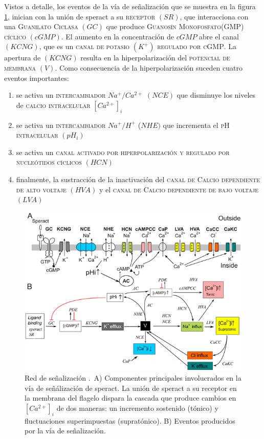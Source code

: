 Vistos a detalle, los eventos de la vía de señalización que se muestra en la figura \ref{fig:erizobBioquimica}, inician con la unión de speract a su \textsc{receptor} $(SR)$, que interacciona con una \textsc{Guanilato Ciclasa} $(GC)$ que produce \textsc{Guanosín Monofosfato(GMP) cíclico} $(cGMP)$. El aumento en la concentración de $cGMP$ abre el canal $(KCNG)$, que es un \textsc{canal de potasio} $(K^+)$ \textsc{regulado por cGMP}. La apertura de $(KCNG)$ resulta en la hiperpolarización del \textsc{potencial de membrana} $(V)$. Como consecuencia de la hiperpolarización suceden cuatro eventos importantes: \begin{enumerate}
\item se activa un \textsc{intercambiador} $Na^+/Ca^{2+}$ $(NCE)$ que disminuye los niveles de \textsc{calcio intracelular} $[Ca^{2+}]_i$
\item se activa un \textsc{intercambiador} $Na^+/H^+$ ($NHE)$ que incrementa el \textsc{pH intracelular} $(pH_i)$
\item se activa un \textsc{canal activado por hiperpolarización y regulado por nucleótidos cíclicos} $(HCN)$
\item finalmente, la sustracción de la inactivación del \textsc{canal de Calcio dependiente de alto voltaje} $(HVA)$ y el \textsc{canal de Calcio dependiente de bajo voltaje} $(LVA)$
\end{enumerate}

\begin{figure}[hbt]
\includegraphics[width=0.9\linewidth]{gfx/redErizoBioquimica}
\caption[Red de se\~nalizaci\'on]{Red de se\~nalizaci\'on \citeauthor{Espinal2011} \citep{Espinal2011}.\ A) Componentes principales involucrados en la vía de señálización de speract. La unión de speract a su receptor en la membrana del flagelo dispara la cascada que produce cambios en $[Ca^{2+}]_i$ de dos maneras: un incremento sostenido (tónico) y fluctuaciones superimpuestas (supratónico). B) Eventos producidos por la vía de señalización.}\label{fig:erizobBioquimica}
\end{figure}

